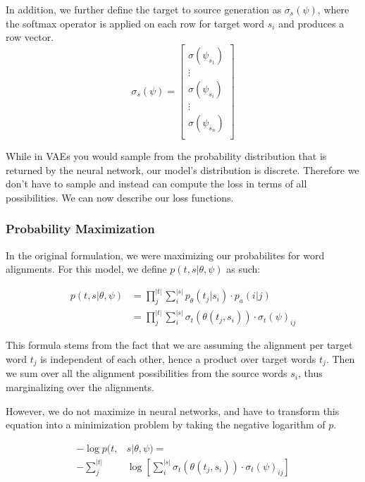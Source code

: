 \documentclass[twoside,twocolumn]{article}
\begin{document}
In addition, we further define the target to source generation as $\sigma_s(\psi)$, where the softmax operator is applied on each row for target word $s_i$ and produces a row vector.
\begin{equation}
  \sigma_s(\psi) = \left[
    \begin{matrix}
      \sigma(\psi_{s_1})  \\
      \vdots \\
      \sigma(\psi_{s_i})  \\
      \vdots \\
      \sigma(\psi_{s_n})  \\
    \end{matrix}
\right]
\end{equation}

While in VAEs you would sample from the probability distribution that is returned by the neural network, our model's distribution is discrete. Therefore we don’t have to sample and instead can compute the loss in terms of all possibilities. We can now describe our loss functions.

\subsubsection{Probability Maximization}
In the original formulation, we were maximizing our probabilites for word alignments. For this model, we define $p(t, s | \theta, \psi)$ as such:

\begin{equation}
  \begin{split}
  p(t, s | \theta, \psi) &= \prod_j^{|t|} \sum_i^{|s|} p_\theta(t_j| s_i) \cdot p_a(i|j) \\
  &= \prod_j^{|t|} \sum_i^{|s|} \sigma_t(\theta(t_j, s_i)) \cdot \sigma_t(\psi)_{ij}
  \end{split}
\end{equation}

This formula stems from the fact that we are assuming the alignment per target word $t_j$ is independent of each other, hence a product over target words $t_j$. Then we sum over all the alignment possibilities from the source words $s_i$, thus marginalizing over the alignments.

However, we do not maximize in neural networks, and have to transform this equation into a minimization problem by taking the negative logarithm of $p$.

\begin{equation}
  \begin{split}
  -\log p(t, & s | \theta, \psi) = \\
  - \sum_j^{|t|} & \log \left[ \sum_i^{|s|} \sigma_t \left( \theta(t_j, s_i) \right) \cdot \sigma_t(\psi)_{ij} \right]
\end{split}
\end{equation}
\end{document}
